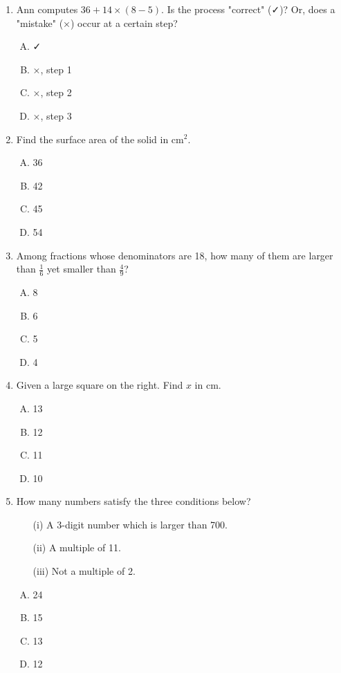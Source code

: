 \documentclass[12pt]{scrartcl}
\begin{document}
\begin{enumerate}[resume]
\item Ann computes $36 + 14 \times (8 - 5)$. Is the process "correct" (✓)? Or, does a "mistake" (×) occur at a certain step?
\begin{enumerate}[(A)]
    \item ✓ \item ×, step 1 \item ×, step 2 \item ×, step 3
\end{enumerate}

\item Find the surface area of the solid in cm$^2$.
\begin{enumerate}[(A)]
    \item 36 \item 42 \item 45 \item 54
\end{enumerate}

\item Among fractions whose denominators are 18, how many of them are larger than $\frac{1}{6}$ yet smaller than $\frac{4}{9}$?
\begin{enumerate}[(A)]
    \item 8 \item 6 \item 5 \item 4
\end{enumerate}

\item Given a large square on the right. Find $x$ in cm.
\begin{enumerate}[(A)]
    \item 13 \item 12 \item 11 \item 10
\end{enumerate}

\item How many numbers satisfy the three conditions below?
\begin{itemize}
    \item[(i)] A 3-digit number which is larger than 700.
    \item[(ii)] A multiple of 11.
    \item[(iii)] Not a multiple of 2.
\end{itemize}
\begin{enumerate}[(A)]
    \item 24 \item 15 \item 13 \item 12
\end{enumerate}
\end{enumerate}
\end{document}
